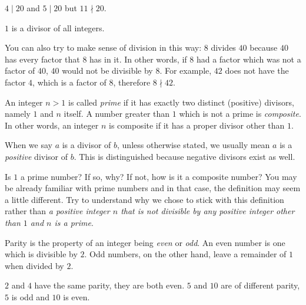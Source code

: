 \documentclass{subfile}
\begin{document}
	\begin{example}
		$4 \mid 20$ and $5 \mid 20$ but $11\nmid 20$.
	\end{example}

	\begin{example}
		$1$ is a divisor of all integers.
	\end{example}

	You can also try to make sense of division in this way: $8$ divides $40$ because $40$ has every factor that $8$ has in it. In other words, if $8$ had a factor which was not a factor of $40$, $40$ would not be divisible by $8$. For example, $42$ does not have the factor $4$, which is a factor of $8$, therefore $8 \nmid 42$.

	\begin{definition}
		An integer $n>1$ is called \textit{prime} if it has exactly two distinct (positive) divisors, namely $1$ and $n$ itself. A number greater than $1$ which is not a prime is \textit{composite}. In other words, an integer $n$ is composite if it has a proper divisor other than $1$.
	\end{definition}

	\begin{note}
		When we say $a$ is a divisor of $b$, unless otherwise stated, we usually mean $a$ is a \textit{positive} divisor of $b$. This is distinguished because negative divisors exist as well.
	\end{note}

	\begin{question}
		Is $1$ a prime number? If so, why? If not, how is it a composite number? You may be already familiar with prime numbers and in that case, the definition may seem a little different. Try to understand why we chose to stick with this definition rather than \textit{a positive integer $n$ that is not divisible by any positive integer other than $1$ and $n$ is a prime}.
	\end{question}

	\begin{definition}[Parity]
		Parity is the property of an integer being {\it even} or {\it odd}. An even number is one which is divisible by $2$. Odd numbers, on the other hand, leave a remainder of $1$ when divided by $2$.
	\end{definition}

	\begin{example}
		$2$ and $4$ have the same parity, they are both even. $5$ and $10$ are of different parity, $5$ is odd and $10$ is even.
	\end{example}
\end{document}
